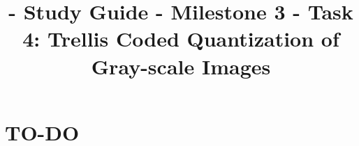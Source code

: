 

\title{\SM{} - Study Guide - Milestone 3 - Task 4: Trellis Coded Quantization of Gray-scale Images}

\maketitle
\tableofcontents

\section{TO-DO}
